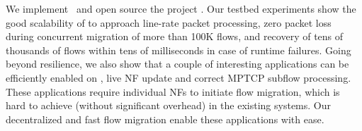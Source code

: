 We implement \nfactor~and open source the project \cite{projectcode}.
Our testbed experiments show the good scalability of \nfactor to approach line-rate packet processing, zero packet loss during concurrent migration of more than 100K flows, and recovery of tens of thousands of flows within tens of milliseconds in case of runtime failures. %
Going beyond resilience, we also show that a couple of interesting applications can be efficiently enabled on \nfactor, live NF update and correct MPTCP subflow processing. These applications require individual NFs to initiate flow migration, %
which is hard to achieve (without significant overhead) in the existing systems. %
Our decentralized and fast flow migration enable these applications with ease. %








